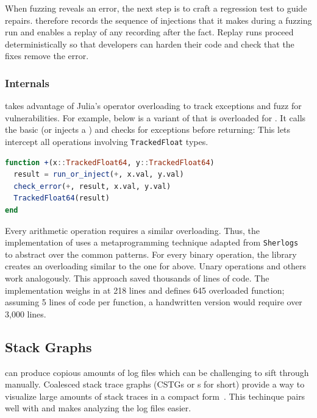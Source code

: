 \documentclass{juliacon}
\begin{document}
When fuzzing reveals an error, the next step is to craft a regression test to
guide repairs.
\FT{} therefore records the sequence of injections that it makes during a fuzzing
run and enables a replay of any recording after the fact.
Replay runs proceed deterministically so that developers can harden
their code and check that the fixes remove the error.


\subsubsection{\FT{} Internals}

\FT{} takes advantage of Julia's operator overloading to track exceptions and
fuzz for vulnerabilities.
For example, below is a variant of \code{+} that is overloaded
for .
It calls the basic \code{+} (or injects a \Nan{}) and checks for exceptions
before returning:
This lets \FT{} intercept all \fp{} operations involving \texttt{TrackedFloat} types.

\begin{lstlisting}[language = Julia]
function +(x::TrackedFloat64, y::TrackedFloat64)
  result = run_or_inject(+, x.val, y.val)
  check_error(+, result, x.val, y.val)
  TrackedFloat64(result)
end
\end{lstlisting}

Every arithmetic operation requires a similar overloading.
Thus, the implementation of \FT{} uses a metaprogramming technique
adapted from \texttt{Sherlogs}~\cite{kMilanklSherlogsJl2021}
to abstract over the common patterns.
For every binary operation, the library creates an overloading similar
to the one for \code{+} above.
Unary operations and others work analogously.
This approach saved thousands of lines of code.
The implementation weighs in at 218 lines and defines 645 overloaded function;
assuming 5 lines of code per function, a handwritten version would require over 3,000 lines.


\subsection{Stack Graphs}
\label{s:cstg}

\FT{} can produce copious amounts of log files which can be challenging to sift through manually.
Coalesced stack trace graphs (CSTGs or \CSTG{}s for short) provide a way to visualize large amounts of stack traces in a compact form~\cite{humphreySystematicDebuggingMethods2014}.
This techinque pairs well with \FT{} and makes analyzing the log files easier.
\end{document}
